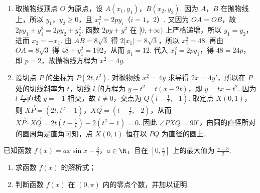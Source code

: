 \begin{solution}
\begin{enumerate}
\item 取抛物线顶点 \(O\) 为原点，设 \(A(x_1,y_1)\)，\(B(x_2,y_2)\). 因为 \(A\)，\(B\) 在抛物线上，所以 \(y_1\)，\(y_2\geqslant0\)，且 \(x_i^2=2py_i\)（\(i=1\)，\(2\)）. 又因为 \(OA=OB\)，故 \(2py_1+y_1^2=2py_2+y_2^2\). 函数 \(2py+y^2\) 在 \([0,+\infty)\) 上严格递增，所以 \(y_1=y_2\)，进而 \(x_2=-x_1\). 由 \(AB=8\sqrt{3}\) 得 \(2|x_1|=8\sqrt{3}\)，所以 \(x_1^2=48\). 再由 \(OA=8\sqrt{3}\) 得 \(48+y_1^2=192\)，从而 \(y_1=12\). 代入 \(x_1^2=2py_1\)，得 \(48=24p\)，即 \(p=2\)，故抛物线方程为 \(x^2=4y\).
\item 设切点 \(P\) 的坐标为 \(P(2t,t^2)\). 对抛物线 \(x^2=4y\) 求导得 \(2x=4y'\)，所以在 \(P\) 处的切线斜率为 \(t\)，切线 \(l\) 的方程为 \(y-t^2=t(x-2t)\)，即 \(y=tx-t^2\). 因为 \(l\) 与直线 \(y=-1\) 相交，故 \(t\neq0\)，交点为 \(Q\left(t-\frac1t,-1\right)\). 取定点 \(X(0,1)\)，则 \(\overrightarrow{XP}=(2t,t^2-1)\)，\(\overrightarrow{XQ}=\left(t-\frac1t,-2\right)\)，从而 \(\overrightarrow{XP}\cdot\overrightarrow{XQ}=2t\left(t-\frac1t\right)-2(t^2-1)=0\). 因此 \(\angle PXQ=90^{\circ}\)，由圆的直径所对的圆周角是直角可知，点 \(X(0,1)\) 恒在以 \(PQ\) 为直径的圆上.
\end{enumerate}
\end{solution}

\begin{problem}
已知函数 \( f(x) = ax \sin x - \frac{3}{2} \)，\(a \in \R\)，且在 \([0, \frac{\pi}{2}]\) 上的最大值为 \(\frac{\pi - 3}{2}\).
\begin{enumerate}
\item 求函数 \( f(x) \) 的解析式；
\item 判断函数 \( f(x) \) 在 \( (0, \pi) \) 内的零点个数，并加以证明.
\end{enumerate}
\end{problem}

